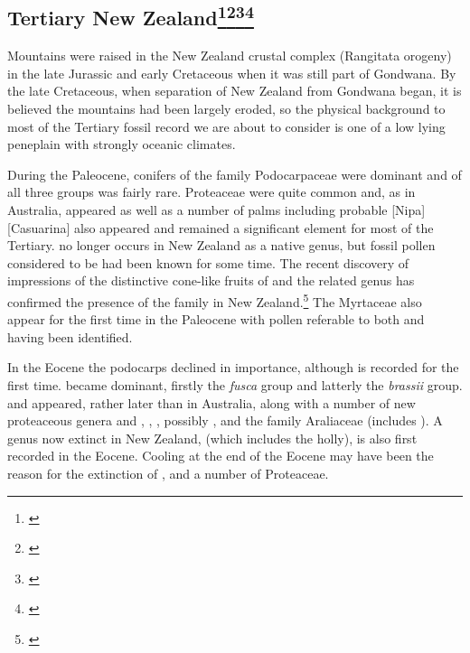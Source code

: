 \subsection[Tertiary New Zealand]{Tertiary New Zealand\thinspace\footnote{\cite{mildenhall1980new}}\footnote{\cite{fleming1979geological}}\footnote{\cite{mildenhall1984palaeobotanical}}\footnote{\cite{pocknall1984late}}}

Mountains were raised in the New Zealand crustal complex (Rangitata orogeny) in the late Jurassic and early Cretaceous when it was still part of Gondwana.
By the late Cretaceous, when separation of New Zealand from Gondwana began, it is believed the mountains had been largely eroded, so the physical background to most of the Tertiary fossil record we are about to consider is one of a low lying peneplain with strongly oceanic climates.

During the Paleocene, conifers of the family Podocarpaceae were dominant and  of all three groups was fairly rare.
Proteaceae were quite common and, as in Australia,  appeared as well as a number of palms including probable [Nipa][Casuarina] also appeared and remained a significant element for most of the Tertiary.
 no longer occurs in New Zealand as a native genus, but fossil pollen considered to be  had been known for some time.
The recent discovery of impressions of the distinctive cone-like fruits of  and the related genus  has confirmed the presence of the family in New Zealand.\footnote{\cite{campbell1985megafossils}}
The Myrtaceae also appear for the first time in the Paleocene with pollen referable to both  and  having been identified.

In the Eocene the podocarps declined in importance, although  is recorded for the first time.  became dominant, firstly the \emph{fusca} group and latterly the \emph{brassii} group.  and  appeared, rather later than in Australia, along with a number of new proteaceous genera and , , , possibly , and the family Araliaceae (includes ).
A genus now extinct in New Zealand,  (which includes the holly), is also first recorded in the Eocene.
Cooling at the end of the Eocene may have been the reason for the extinction of ,  and a number of Proteaceae.

